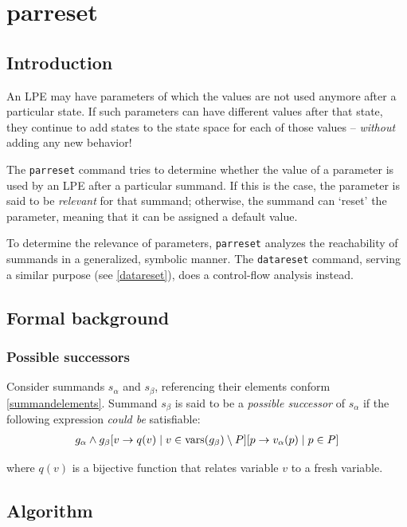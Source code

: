 \chapter{parreset}

\section{Introduction}

An LPE may have parameters of which the values are not used anymore after a particular state.
If such parameters can have different values after that state, they continue to add states to the state space for each of those values -- \emph{without} adding any new behavior!

The \texttt{parreset} command tries to determine whether the value of a parameter is used by an LPE after a particular summand.
If this is the case, the parameter is said to be \emph{relevant} for that summand; otherwise, the summand can `reset' the parameter, meaning that it can be assigned a default value.

To determine the relevance of parameters, \texttt{parreset} analyzes the reachability of summands in a generalized, symbolic manner.
The \texttt{datareset} command, serving a similar purpose (see \ref{datareset}), does a control-flow analysis instead.

\section{Formal background}

\subsection{Possible successors} \label{possiblesuccessors}

Consider summands $s_\alpha$ and $s_\beta$, referencing their elements conform \ref{summandelements}.
Summand $s_\beta$ is said to be a \emph{possible successor} of $s_\alpha$ if the following expression \emph{could be} satisfiable:
\begin{align*}
g_\alpha \land {g_\beta}[v \rightarrow q(v) \;|\; v \in \text{vars}(g_\beta) \setminus P][p \rightarrow v_\alpha(p) \;|\; p \in P]
\end{align*}

where $q(v)$ is a bijective function that relates variable $v$ to a fresh variable.

\section{Algorithm}

